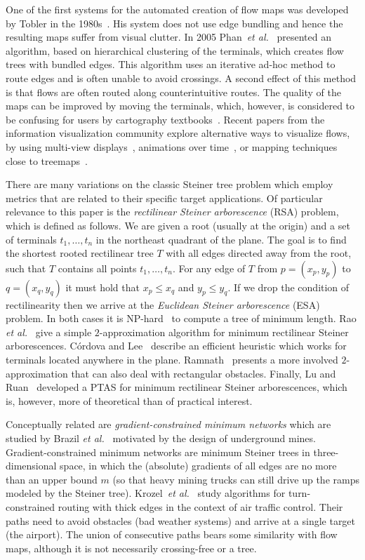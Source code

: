 \documentclass{journalA4}
\newcommand{\etal}{{\emph{et al.}\xspace}}
\begin{document}
One of the first systems for the automated creation of flow maps was developed by Tobler in the 1980s~\cite{FlowMapper,WaldoTobler1987}. His system does not use edge bundling and hence the resulting maps suffer from visual clutter. In 2005 Phan~\etal~\cite{Phan2005} presented an algorithm, based on hierarchical clustering of the terminals, which creates flow trees with bundled edges. This algorithm uses an iterative ad-hoc method to route edges and is often unable to avoid crossings. A second effect of this method is that flows are often routed along counterintuitive routes. The quality of the maps can be improved by moving the terminals, which, however, is considered to be confusing for users by cartography textbooks~\cite{Slocum2010}. Recent papers from the information visualization community explore alternative ways to visualize flows, by using multi-view displays~\cite{Guo2009}, animations over time~\cite{Boyandin2010}, or mapping techniques close to treemaps~\cite{Wood2010}.

There are many variations on the classic Steiner tree problem which employ metrics that are related to their specific target applications. Of particular relevance to this paper is the \emph{rectilinear Steiner arborescence} (RSA) problem, which is defined as follows. We are given a root (usually at the origin) and a set of terminals $t_1, \ldots, t_n$ in the northeast quadrant of the plane. The goal is to find the shortest rooted rectilinear tree $T$ with all edges directed away from the root, such that $T$ contains all points $t_1, \ldots, t_n$. For any edge of $T$ from $p = (x_p, y_p)$ to $q = (x_q, y_q)$ it must hold that $x_p \leq x_q$ and $y_p \leq y_q$. If we drop the condition of rectilinearity then we arrive at the \emph{Euclidean Steiner arborescence} (ESA) problem. In both cases it is  NP-hard~\cite{Shi2000,ss-rsap-05} to compute a tree of minimum length. Rao \etal~\cite{Rao92} give a simple $2$-approximation algorithm for minimum rectilinear Steiner arborescences. C\'{o}rdova and Lee~\cite{Cordova94} describe an efficient heuristic which works for terminals located anywhere in the plane. Ramnath~\cite{Ramnath03} presents a more involved $2$-approximation that can also deal with rectangular obstacles.  Finally, Lu and Ruan~\cite{Lu2000} developed a PTAS for minimum rectilinear Steiner arborescences, which is, however, more of theoretical than of practical interest.

Conceptually related are \emph{gradient-constrained minimum networks} which are studied by Brazil \etal~\cite{Brazil2001,Brazil2007} motivated by the design of
underground mines. Gradient-constrained minimum networks are minimum Steiner trees in three-dimensional space, in which the (absolute) gradients of all edges are no more than an upper bound $m$ (so that heavy mining trucks can still drive up the ramps modeled by the Steiner tree). Krozel~\etal~\cite{Krozel2006} study algorithms for turn-constrained routing with thick edges in the context of air traffic control. Their paths need to avoid obstacles (bad weather systems) and arrive at a single target (the airport). The union of consecutive paths bears some similarity with flow maps, although it is not necessarily crossing-free or a tree.
\end{document}
